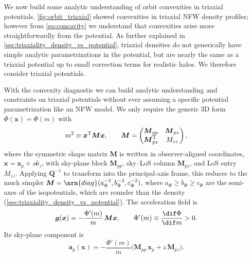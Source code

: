 \documentclass[linenumbers,twocolumn]{aastex701}
\renewcommand{\mbf}[1]{\boldsymbol{#1}}
\newcommand{\zhat}{\hat{\mbf{e}}_z} %
\newcommand{\xvec}{\mbf{x}}  %
\newcommand{\avec}{\mbf{a}}  %
\newcommand{\proj}[1]{{#1}_{p}}  %
\newcommand{\xsky}{\proj{\xvec}}  %
\newcommand{\asky}{\proj{\avec}}  %
\begin{document}
        We now build some analytic understanding of orbit convexities in triaxial potentials. %
        \autoref{fig:orbit_triaxial} showed convexities in triaxial \gls{NFW} density profiles; however from \cref{eq:concavity} we understand that convexities arise more straightforwardly from the potential. %
        As further explained in \autoref{sec:triaxiality_density_vs_potential}, triaxial densities do not generically have simple analytic parametrizations in the potential, but are nearly the same as a triaxial potential up to small correction terms for realistic halos. %
        We therefore consider triaxial potentials. %

        With the convexity diagnostic we can build analytic understanding and constraints on triaxial potentials without ever assuming a specific potential parametrization like an \gls{NFW} model. We only require the generic 3D form $\Phi(\xvec) = \Phi(m)$ with %
        \begin{equation}\label{eq:theory:orbit:triaxial:m_def}
            m^2 \equiv \xvec^{\rm T}\mbf{M}\xvec,
            \qquad
            \mbf{M} = \begin{pmatrix} \mbf{M}_{pp} & \mbf{M}_{pz} \\ \mbf{M}_{pz}^{\rm T} & M_{zz} \end{pmatrix},
        \end{equation}
        where the symmetric shape matrix $\mbf{M}$ is written in observer-aligned coordinates, $\xvec = \xsky + z\zhat$, with sky-plane block $\mbf{M}_{pp}$, sky--\gls{LoS} column $\mbf{M}_{pz}$, and \gls{LoS} entry $M_{zz}$. %
        Applying $\mbf{Q}^{-1}$ to transform into the principal-axis frame, this reduces to the much simpler $\mbf{M} = \mrm{diag}(a_\Phi^{-2},b_\Phi^{-2},c_\Phi^{-2})$, where $a_\Phi \ge b_\Phi \ge c_\Phi$ are the semi-axes of the isopotentials, which are rounder than the density (\autoref{sec:triaxiality_density_vs_potential}). %
        The acceleration field is
        \begin{equation}\label{eq:theory:orbit:triaxial:g}
            \mbf{g}(\xvec) = -\frac{\Phi'(m)}{m}\,\mbf{M}\xvec,
            \qquad \Phi'(m) \equiv \frac{\dif\Phi}{\dif m} > 0.
        \end{equation}
        Its sky-plane component is
        \begin{equation}\label{eq:theory:orbit:triaxial:asky}
            \asky(\xvec) = -\frac{\Phi'(m)}{m}\bigl(\mbf{M}_{pp}\,\xsky + z\,\mbf{M}_{pz}\bigr). %
        \end{equation}
\end{document}
